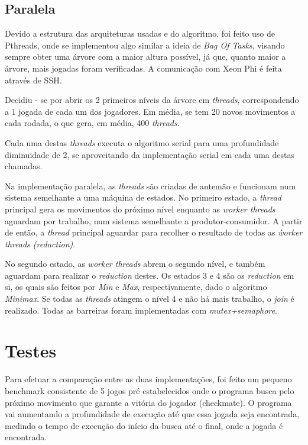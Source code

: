 \documentclass[12pt,a4paper,final]{article}
\begin{document}
\subsection{Paralela}

Devido a estrutura das arquiteturas usadas e do algoritmo, foi feito uso de Pthreads, onde se implementou algo similar a ideia de \textit{Bag Of Tasks}, visando sempre obter uma árvore com a maior altura possível, já que, quanto maior a árvore, mais jogadas foram verificadas. A comunicação com Xeon Phi é feita através de SSH.

Decidiu - se por abrir os 2 primeiros níveis da árvore em \textit{threads}, correspondendo a 1 jogada de cada um dos jogadores. Em média, se tem 20 novos movimentos a cada rodada, o que gera, em média, 400 \textit{threads}.

Cada uma destas \textit{threads} executa o algoritmo serial para uma profundidade diminuidade de 2, se aproveitando da implementação serial em cada uma destas chamadas.

Na implementação paralela, as \textit{threads} são criadas de antemão e funcionam num sistema semelhante a uma máquina de estados. No primeiro estado, a \textit{thread} principal gera os movimentos do próximo nível enquanto as \textit{worker threads} aguardam por trabalho, num sistema semelhante a produtor-consumidor. A partir de então, a \textit{thread} principal aguardar para recolher o resultado de todas as \textit{ẁorker threads (reduction)}.

No segundo estado, as \textit{worker threads} abrem o segundo nível, e também aguardam para realizar o \textit{reduction} destes. Os estados 3 e 4 são os \textit{reduction} em si, os quais são feitos por \textit{Min} e \textit{Max}, respectivamente, dado o algoritmo \textit{Minimax}. Se todas as \textit{threads} atingem o nível 4 e não há mais trabalho, o \textit{join} é realizado. Todas as barreiras foram implementadas com \textit{mutex+semaphore}.

\section{Testes}

Para efetuar a comparação entre as duas implementações, foi feito um pequeno benchmark consistente de 5 jogos pré estabelecidos onde o programa busca pelo próximo movimento que garante a vitória do jogador (checkmate). O programa vai aumentando a profundidade de execução até que essa jogada seja encontrada, medindo o tempo de execução do início da busca até o final, onde a jogada é encontrada.
\end{document}
